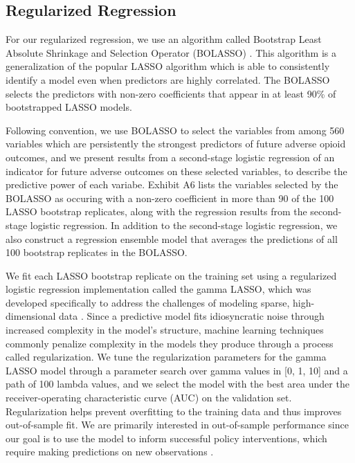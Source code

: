 \documentclass[9pt,twoside,lineno]{pnas-new}
\begin{document}
\subsection{Regularized Regression}

For our regularized regression, we use an algorithm called Bootstrap Least Absolute Shrinkage and Selection Operator (BOLASSO) \cite{bach}. This algorithm is a generalization of the popular LASSO algorithm which is able to consistently identify a model even when predictors are highly correlated. The BOLASSO selects the predictors with non-zero coefficients that appear in at least 90\% of bootstrapped LASSO models. 

Following convention, we use BOLASSO to select the variables from among 560 variables which are persistently the strongest predictors of future adverse opioid outcomes, and we present results from a second-stage logistic regression of an indicator for future adverse outcomes on these selected variables, to describe the predictive power of each variabe. Exhibit A6 lists the variables selected by the BOLASSO as occuring with a non-zero coefficient in more than 90 of the 100 LASSO bootstrap replicates, along with the regression results from the second-stage logistic regression. In addition to the second-stage logistic regression, we also construct a regression ensemble model that averages the predictions of all 100 bootstrap replicates in the BOLASSO.

We fit each LASSO bootstrap replicate on the training set using a regularized logistic regression implementation called the gamma LASSO, which was developed specifically to address the challenges of modeling sparse, high-dimensional data \cite{taddy}. Since a predictive model fits idiosyncratic noise through increased complexity in the model's structure, machine learning techniques commonly penalize complexity in the models they produce through a process called regularization. We tune the regularization parameters for the gamma LASSO model through a parameter search over gamma values in [0, 1, 10] and a path of 100 lambda values, and we select the model with the best area under the receiver-operating characteristic curve (AUC) on the validation set. Regularization helps prevent overfitting to the training data and thus improves out-of-sample fit. We are primarily interested in out-of-sample performance since our goal is to use the model to inform successful policy interventions, which require making predictions on new observations \cite{kleinberg}.
\end{document}
